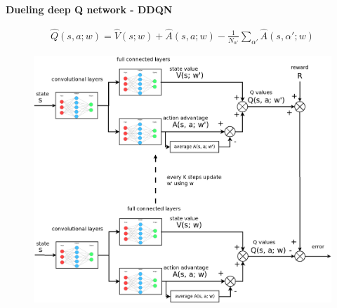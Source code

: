 \documentclass[xcolor=dvipsnames]{beamer}
\begin{document}
\begin{frame}{\bf Dueling deep Q network - DDQN}

\begin{align*}
  \hat{Q}(s, a; w) = \hat{V}(s; w) + \hat{A}(s, a; w) - \frac{1}{N_{\alpha'}} \sum_{\alpha'} \hat{A}(s, \alpha'; w)
\end{align*}

\begin{figure}[!htb]
  \centering
  \includegraphics[scale=0.18]{../../diagrams/dueling_dqn_1.png}
  \label{img:ddqn_full}
\end{figure}

\end{frame}
\end{document}
